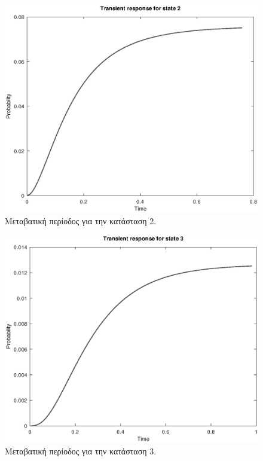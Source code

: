 \documentclass {article}
\begin{document}
\begin{figure}
	\includegraphics[width=\linewidth]{trans_2}
	\caption{Μεταβατική περίοδος για την κατάσταση 2.}
	\label{fig:trans_2}
\end{figure}

\begin{figure}
	\includegraphics[width=\linewidth]{trans_3}
	\caption{Μεταβατική περίοδος για την κατάσταση 3.}
	\label{fig:trans_3}
\end{figure}
\end{document}
